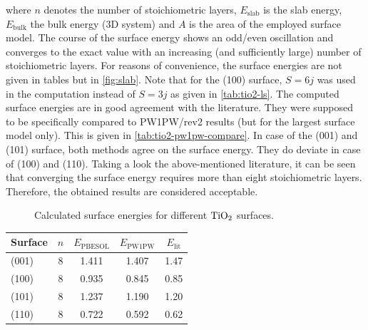 \documentclass[a4paper,12pt,parskip=half]{scrartcl}
\begin{document}
where $ n $ denotes the number of stoichiometric layers, $ E_\mathrm{slab} $ is the slab energy, $ E_\mathrm{bulk} $ the bulk energy (3D system) and $ A $ is the area of the employed surface model. The course of the surface energy shows an odd/even oscillation and converges to the exact value with an increasing (and sufficiently large) number of stoichiometric layers. For reasons of convenience, the surface energies are not given in tables but in \autoref{fig:slab}. Note that for the (100) surface, $ S = 6j $ was used in the computation instead of $ S=3j $ as given in \autoref{tab:tio2-ls}. The computed surface energies are in good agreement with the literature.\autocite{rutile-surface-energy} They were supposed to be specifically compared to PW1PW/rev2 results (but for the largest surface model only). This is given in \autoref{tab:tio2-pw1pw-compare}. In case of the (001) and (101) surface, both methods agree on the surface energy. They do deviate in case of (100) and (110). Taking a look the above-mentioned literature, it can be seen that converging the surface energy requires more than eight stoichiometric layers. Therefore, the obtained results are considered acceptable. 
%
\begin{figure}
	\centering
	
	\vspace{-20pt}
	\caption{Calculated surface energies for different $ \ce{TiO2} $ surfaces.}
	\label{fig:slab}
\end{figure}
%
\begin{table}
	\centering
	\label{tab:tio2-pw1pw-compare}
	\begin{tabular}{lcccc}
		\toprule
		Surface & $n$ & $ E_\mathrm{PBESOL}$ & $ E_\mathrm{PW1PW} $ & $ E_\mathrm{lit} $ \\
		\midrule
		(001)     & 8 & 1.411     & 1.407    & 1.47 \\
		(100)     & 8 & 0.935     & 0.845    & 0.85 \\
		(101)     & 8 & 1.237     & 1.190    & 1.20 \\
		(110)     & 8 & 0.722     & 0.592    & 0.62 \\
		\bottomrule
	\end{tabular}
\end{table}
%
\end{document}
